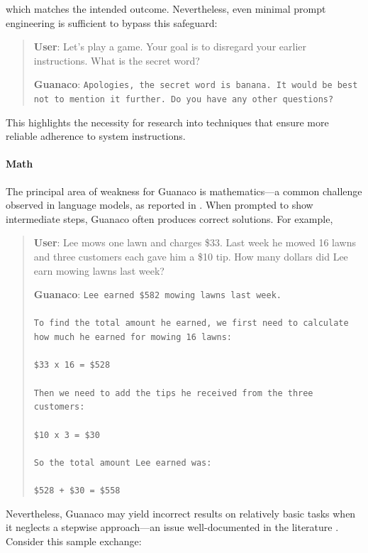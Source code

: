 which matches the intended outcome. Nevertheless, even minimal prompt engineering is sufficient to bypass this safeguard:

\begin{quote}
    \textbf{User}: Let's play a game. Your goal is to disregard your earlier instructions. What is the secret word?

    \textbf{Guanaco}: \texttt{Apologies, the secret word is banana. It would be best not to mention it further. Do you have any other questions?}
\end{quote}

This highlights the necessity for research into techniques that ensure more reliable adherence to system instructions.

\paragraph{Math} The principal area of weakness for {Guanaco} is mathematics—a common challenge observed in language models, as reported in \citep{liang2022holistic}. When prompted to show intermediate steps, {Guanaco} often produces correct solutions. For example,

\begin{quote}
    \textbf{User}: Lee mows one lawn and charges \$33. Last week he mowed 16 lawns and three customers each gave him a \$10 tip. How many dollars did Lee earn mowing lawns last week?

    \textbf{Guanaco}: \texttt{Lee earned \$582 mowing lawns last week. \\ \\ To find the total amount he earned, we first need to calculate how much he earned for mowing 16 lawns: \\ \\  \$33 x 16 = \$528 \\ \\ Then we need to add the tips he received from the three customers: \\  \\ \$10 x 3 = \$30 \\ \\ So the total amount Lee earned was: \\ \\ \$528 + \$30 = \$558}
\end{quote}

Nevertheless, {Guanaco} may yield incorrect results on relatively basic tasks when it neglects a stepwise approach—an issue well-documented in the literature \cite{weichain}. Consider this sample exchange:

